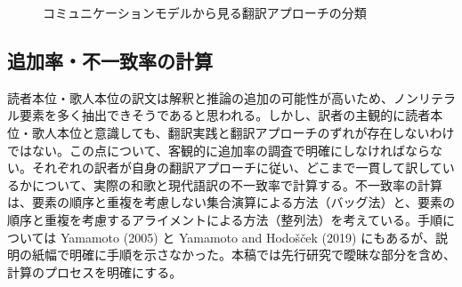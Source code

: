 \documentclass[
  letterpaper,
  DIV=11,
  numbers=noendperiod]{scrartcl}
\begin{document}
\begin{figure}

\begin{minipage}{\linewidth}



\end{minipage}%
\newline
\begin{minipage}{\linewidth}



\end{minipage}%

\caption{\label{fig-schramm-schema}コミュニケーションモデルから見る翻訳アプローチの分類}

\end{figure}%

\subsection{追加率・不一致率の計算}\label{ux8ffdux52a0ux7387ux4e0dux4e00ux81f4ux7387ux306eux8a08ux7b97}

読者本位・歌人本位の訳文は解釈と推論の追加の可能性が高いため、ノンリテラル要素を多く抽出できそうであると思われる。しかし、訳者の主観的に読者本位・歌人本位と意識しても、翻訳実践と翻訳アプローチのずれが存在しないわけではない。この点について、客観的に追加率の調査で明確にしなければならない。それぞれの訳者が自身の翻訳アプローチに従い、どこまで一貫して訳しているかについて、実際の和歌と現代語訳の不一致率で計算する。不一致率の計算は、要素の順序と重複を考慮しない集合演算による方法（バッグ法）と、要素の順序と重複を考慮するアライメントによる方法（整列法）を考えている。手順については
Yamamoto (2005) と Yamamoto and Hodošček (2019)
にもあるが、説明の紙幅で明確に手順を示さなかった。本稿では先行研究で曖昧な部分を含め、計算のプロセスを明確にする。
\end{document}
